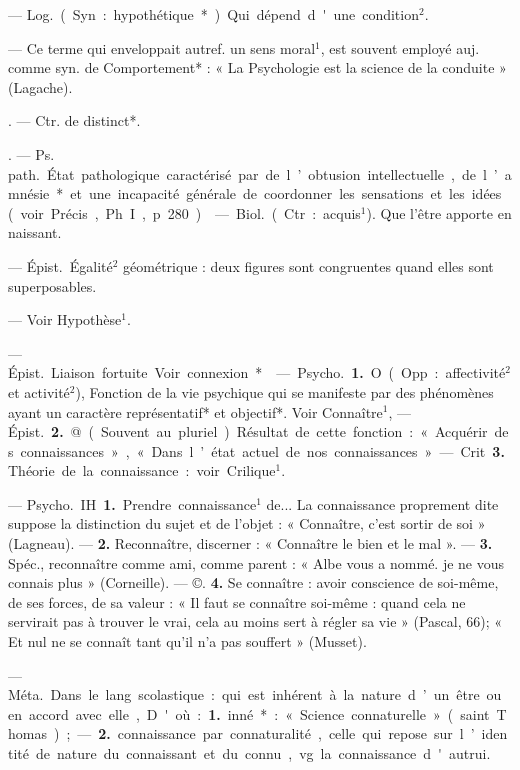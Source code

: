 \begin{itemize}[leftmargin=1cm, label=, itemsep=11pt]
 — \si{Log.} (Syn. : hypothétique*). Qui dépend d'une condition$^2$.

 — Ce terme qui enveloppait
autref. un sens moral$^1$, est souvent
employé auj. comme syn. de Comportement* : « La Psychologie est la
science de la conduite » (Lagache).

. — Ctr. de distinct*.

. — \si{Ps. path.} État
pathologique caractérisé par de
l’obtusion intellectuelle, de l’amnésie* et une incapacité générale de
coordonner les sensations et les
idées (voir Précis, Ph. I, p. 280).

 — \si{Biol.} (Ctr. : acquis$^1$).
Que l’être apporte en naissant.

 — \si{Épist.} Égalité$^2$ géométrique : deux figures sont congruentes quand elles sont superposables.

 — Voir Hypothèse$^1$.

 — \si{Épist.} Liaison fortuite. Voir connexion*.

 — \si{Psycho.} {\bf 1.} O (Opp. :
affectivité$^2$ et activité$^2$), Fonction de
la vie psychique qui se manifeste
par des phénomènes ayant un caractère représentatif* et objectif*. Voir
Connaître$^1$, — \si{Épist.}  {\bf 2.} @ (Souvent
au pluriel). Résultat de cette fonction : « Acquérir des connaissances »,
« Dans l’état actuel de nos connaissances ».

— Crit.  {\bf 3.} Théorie de la connaissance : voir Crilique$^1$.

 — \si{Psycho.} IH {\bf 1.} Prendre
connaissance$^1$ de... La connaissance
proprement dite suppose la distinction du sujet et de l’objet : « Connaître, c’est sortir de soi » (Lagneau).
—  {\bf 2.} Reconnaître, discerner :
« Connaître le bien et le mal ». —
 {\bf 3.} Spéc., reconnaître comme ami,
comme parent : « Albe vous a nommé.
je ne vous connais plus » (Corneille).
— ©.  {\bf 4.} Se connaître : avoir conscience de soi-même, de ses forces,
de sa valeur : « Il faut se connaître
soi-même : quand cela ne servirait
pas à trouver le vrai, cela au moins
sert à régler sa vie » (Pascal, 66); « Et
nul ne se connaît tant qu'il n’a pas
souffert » (Musset).

 — \si{Méta.} Dans le lang.
scolastique : qui est inhérent à la
nature d’un être ou en accord avec
elle, D'où : {\bf 1.} inné* : « Science connaturelle » (saint Thomas) ; —  {\bf 2.} connaissance par connaturalité, celle
qui repose sur l’identité de nature
du connaissant et du connu, vg. la
connaissance d'autrui.


\end{itemize}
